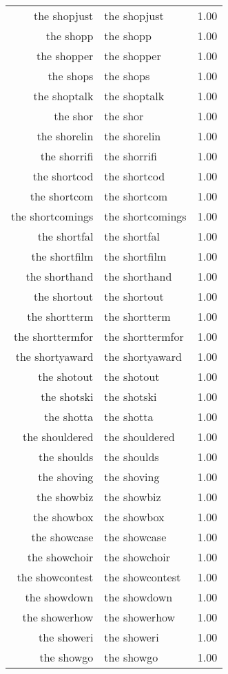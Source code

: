 \begin{table}[ht]
\begin{tabular}{rlr}
  the shopjust & the shopjust & 1.00 \\ 
  the shopp & the shopp & 1.00 \\ 
  the shopper & the shopper & 1.00 \\ 
  the shops & the shops & 1.00 \\ 
  the shoptalk & the shoptalk & 1.00 \\ 
  the shor & the shor & 1.00 \\ 
  the shorelin & the shorelin & 1.00 \\ 
  the shorrifi & the shorrifi & 1.00 \\ 
  the shortcod & the shortcod & 1.00 \\ 
  the shortcom & the shortcom & 1.00 \\ 
  the shortcomings & the shortcomings & 1.00 \\ 
  the shortfal & the shortfal & 1.00 \\ 
  the shortfilm & the shortfilm & 1.00 \\ 
  the shorthand & the shorthand & 1.00 \\ 
  the shortout & the shortout & 1.00 \\ 
  the shortterm & the shortterm & 1.00 \\ 
  the shorttermfor & the shorttermfor & 1.00 \\ 
  the shortyaward & the shortyaward & 1.00 \\ 
  the shotout & the shotout & 1.00 \\ 
  the shotski & the shotski & 1.00 \\ 
  the shotta & the shotta & 1.00 \\ 
  the shouldered & the shouldered & 1.00 \\ 
  the shoulds & the shoulds & 1.00 \\ 
  the shoving & the shoving & 1.00 \\ 
  the showbiz & the showbiz & 1.00 \\ 
  the showbox & the showbox & 1.00 \\ 
  the showcase & the showcase & 1.00 \\ 
  the showchoir & the showchoir & 1.00 \\ 
  the showcontest & the showcontest & 1.00 \\ 
  the showdown & the showdown & 1.00 \\ 
  the showerhow & the showerhow & 1.00 \\ 
  the showeri & the showeri & 1.00 \\ 
  the showgo & the showgo & 1.00 \\ 

\end{tabular}
\end{table}
